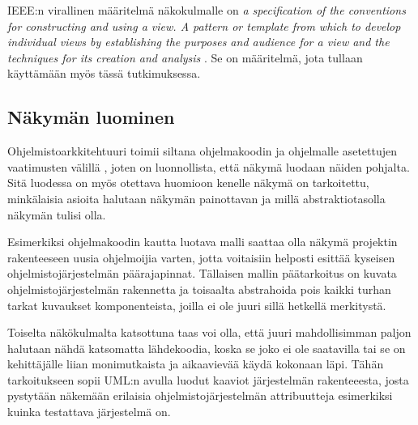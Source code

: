 \documentclass[finnish]{tktltiki2}
\theoremstyle{definition}
\theoremstyle{remark}
\begin{document}
IEEE:n virallinen määritelmä näkokulmalle on \textit{a specification of the conventions for constructing and using a view. A pattern or template
from which to develop individual views by establishing the purposes and audience for a view and the techniques for its creation and analysis} \citep[s. 4]{ieee_2000}. Se on määritelmä, jota tullaan käyttämään myös tässä tutkimuksessa.





\subsection{Näkymän luominen}

Ohjelmistoarkkitehtuuri toimii siltana ohjelmakoodin ja ohjelmalle asetettujen vaatimusten välillä \citep[s. 94]{Garlan:2000:SAR:336512.336537}, joten on luonnollista, että näkymä luodaan näiden pohjalta. Sitä luodessa on myös otettava huomioon kenelle näkymä on tarkoitettu, minkälaisia asioita halutaan näkymän painottavan ja millä abstraktiotasolla näkymän tulisi olla. 

Esimerkiksi ohjelmakoodin kautta luotava malli saattaa olla näkymä projektin rakenteeseen uusia ohjelmoijia varten, jotta voitaisiin helposti esittää kyseisen ohjelmistojärjestelmän päärajapinnat. Tällaisen mallin päätarkoitus on kuvata ohjelmistojärjestelmän rakennetta ja toisaalta abstrahoida pois kaikki turhan tarkat kuvaukset komponenteista, joilla ei ole juuri sillä hetkellä merkitystä. 

Toiselta näkökulmalta katsottuna taas voi olla, että juuri mahdollisimman paljon halutaan nähdä katsomatta lähdekoodia, koska se joko ei ole saatavilla tai se on kehittäjälle liian monimutkaista ja aikaavievää käydä kokonaan läpi. Tähän tarkoitukseen sopii UML:n avulla luodut kaaviot järjestelmän rakenteeesta, josta pystytään näkemään erilaisia ohjelmistojärjestelmän attribuutteja esimerkiksi kuinka testattava järjestelmä on.
\end{document}

